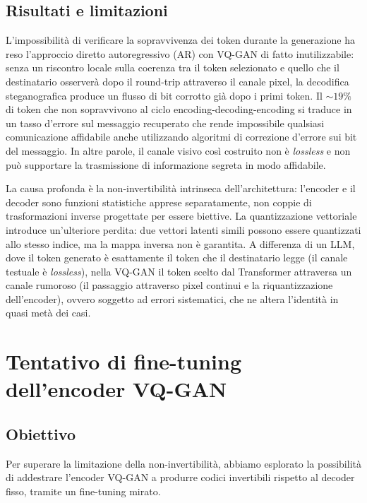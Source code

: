 \subsection{Risultati e limitazioni}

L'impossibilità di verificare la sopravvivenza dei token durante la generazione ha reso l'approccio diretto autoregressivo (AR) con VQ-GAN di fatto inutilizzabile: senza un riscontro locale sulla coerenza tra il token selezionato e quello che il destinatario osserverà dopo il round-trip attraverso il canale pixel, la decodifica steganografica produce un flusso di bit corrotto già dopo i primi token. Il $\sim\!19\%$ di token che non sopravvivono al ciclo encoding-decoding-encoding si traduce in un tasso d'errore sul messaggio recuperato che rende impossibile qualsiasi comunicazione affidabile anche utilizzando algoritmi di correzione d'errore sui bit del messaggio. In altre parole, il canale visivo così costruito non è \emph{lossless} e non può supportare la trasmissione di informazione segreta in modo affidabile.

La causa profonda è la non-invertibilità intrinseca dell'architettura: l'encoder e il decoder sono funzioni statistiche apprese separatamente, non coppie di trasformazioni inverse progettate per essere biettive. La quantizzazione vettoriale introduce un'ulteriore perdita: due vettori latenti simili possono essere quantizzati allo stesso indice, ma la mappa inversa non è garantita. A differenza di un LLM, dove il token generato è esattamente il token che il destinatario legge (il canale testuale è \emph{lossless}), nella VQ-GAN il token scelto dal Transformer attraversa un canale rumoroso (il passaggio attraverso pixel continui e la riquantizzazione dell'encoder), ovvero soggetto ad errori sistematici, che ne altera l'identità in quasi metà dei casi.

\section{Tentativo di fine-tuning dell'encoder VQ-GAN}

\subsection{Obiettivo}

Per superare la limitazione della non-invertibilità, abbiamo esplorato la possibilità di addestrare l'encoder VQ-GAN a produrre codici invertibili rispetto al decoder fisso, tramite un fine-tuning mirato.

